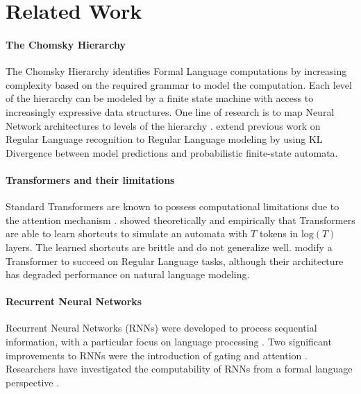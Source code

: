    \section{Related Work}
    
    \paragraph{The Chomsky Hierarchy}
    The Chomsky Hierarchy \citep{chomsky_three_1956, chomsky_certain_1959} identifies Formal Language computations by increasing complexity based on the required grammar to model the computation. Each level of the hierarchy can be modeled by a finite state machine with access to increasingly expressive data structures. One line of research is to map Neural Network architectures to levels of the hierarchy \citep{bhattamishra_ability_2020, deletang_neural_2022, strobl_what_2024}. \citet{borenstein_what_2024} extend previous work on Regular Language recognition to Regular Language modeling by using KL Divergence between model predictions and probabilistic finite-state automata.
    
    \paragraph{Transformers and their limitations}
    Standard Transformers are known to possess computational limitations due to the attention mechanism \citep{merrill_parallelism_2023, strobl_what_2024}. \citet{liu_transformers_2022} showed theoretically and empirically that Transformers are able to learn shortcuts to simulate an automata with $T$ tokens in $\text{log}(T)$ layers. The learned shortcuts are brittle and do not generalize well. \citet{chi_transformer_2023} modify a Transformer to succeed on Regular Language tasks, although their architecture has degraded performance on natural language modeling. 
    
    \paragraph{Recurrent Neural Networks}
    Recurrent Neural Networks (RNNs) were developed to process sequential information, with a particular focus on language processing \citep{jordan_serial_1997, elman_finding_1990}. Two significant improvements to RNNs were the introduction of gating \citep{hochreiter_long_1997, cho-etal-2014-learning} and attention \citep{bahdanau_neural_2015}. Researchers have investigated the computability of RNNs from a formal language perspective \citep{siegelmann_computational_1995, chen_recurrent_2018, nowak_representational_2023, svete_recurrent_2023}.
    
